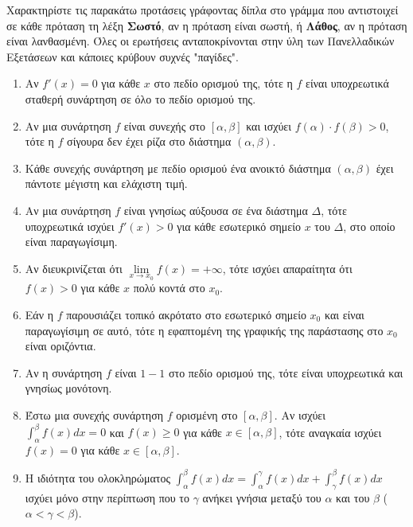 \documentclass[a4paper,11pt,twoside]{article}
\title{\vspace{-2cm}\kerkissans{\textbf{Επαναληπτικά Θέματα Γ Λυκείου - Θεωρία (Θέμα Α)}}\vspace{-0.5cm}}
\date{}
\newcommand{\kerkissans}[1]{{\fontfamily{maksf}\selectfont {#1}}}
\begin{document}
\maketitle

\noindent \kerkissans{\textbf{ΕΡΩΤΗΣΕΙΣ ΣΩΣΤΟ - ΛΑΘΟΣ}}

\vspace{0.3cm}
\noindent Χαρακτηρίστε τις παρακάτω προτάσεις γράφοντας δίπλα στο γράμμα που αντιστοιχεί σε κάθε πρόταση τη λέξη \textbf{Σωστό}, αν η πρόταση είναι σωστή, ή \textbf{Λάθος}, αν η πρόταση είναι λανθασμένη. Όλες οι ερωτήσεις ανταποκρίνονται στην ύλη των Πανελλαδικών Εξετάσεων και κάποιες κρύβουν συχνές "παγίδες".

\begin{enumerate}[label=\textbf{\arabic*.}]
    \item Αν $f'(x) = 0$ για κάθε $x$ στο πεδίο ορισμού της, τότε η $f$ είναι υποχρεωτικά σταθερή συνάρτηση σε όλο το πεδίο ορισμού της.
    \item Αν μια συνάρτηση $f$ είναι συνεχής στο $[\alpha, \beta]$ και ισχύει $f(\alpha) \cdot f(\beta) > 0$, τότε η $f$ σίγουρα δεν έχει ρίζα στο διάστημα $(\alpha, \beta)$.
    \item Κάθε συνεχής συνάρτηση με πεδίο ορισμού ένα ανοικτό διάστημα $(\alpha, \beta)$ έχει πάντοτε μέγιστη και ελάχιστη τιμή.
    \item Αν μια συνάρτηση $f$ είναι γνησίως αύξουσα σε ένα διάστημα $\Delta$, τότε υποχρεωτικά ισχύει $f'(x) > 0$ για κάθε εσωτερικό σημείο $x$ του $\Delta$, στο οποίο είναι παραγωγίσιμη.
    \item Αν διευκρινίζεται ότι $\lim\limits_{x \to x_0} f(x) = +\infty$, τότε ισχύει απαραίτητα ότι $f(x) > 0$ για κάθε $x$ πολύ κοντά στο $x_0$.
    \item Εάν η $f$ παρουσιάζει τοπικό ακρότατο στο εσωτερικό σημείο $x_0$ και είναι παραγωγίσιμη σε αυτό, τότε η εφαπτομένη της γραφικής της παράστασης στο $x_0$ είναι οριζόντια.
    \item Αν η συνάρτηση $f$ είναι $1-1$ στο πεδίο ορισμού της, τότε είναι υποχρεωτικά και γνησίως μονότονη.
    \item Έστω μια συνεχής συνάρτηση $f$ ορισμένη στο $[\alpha, \beta]$. Αν ισχύει $\int_\alpha^\beta f(x) dx = 0$ και $f(x) \ge 0$ για κάθε $x \in [\alpha, \beta]$, τότε αναγκαία ισχύει $f(x) = 0$ για κάθε $x \in [\alpha, \beta]$.
    \item Η ιδιότητα του ολοκληρώματος $\int_\alpha^\beta f(x) dx = \int_\alpha^\gamma f(x) dx + \int_\gamma^\beta f(x) dx$ ισχύει μόνο στην περίπτωση που το $\gamma$ ανήκει γνήσια μεταξύ του $\alpha$ και του $\beta$ ($\alpha < \gamma < \beta$).

\end{enumerate}
\end{document}
